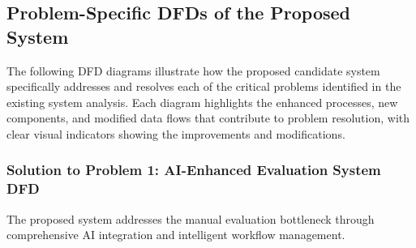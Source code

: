 \documentclass[12pt,a4paper,oneside]{book}
\begin{document}
\subsection{Problem-Specific DFDs of the Proposed System}

The following DFD diagrams illustrate how the proposed candidate system specifically addresses and resolves each of the critical problems identified in the existing system analysis. Each diagram highlights the enhanced processes, new components, and modified data flows that contribute to problem resolution, with clear visual indicators showing the improvements and modifications.

\subsubsection{Solution to Problem 1: AI-Enhanced Evaluation System DFD}

The proposed system addresses the manual evaluation bottleneck through comprehensive AI integration and intelligent workflow management.
\end{document}
